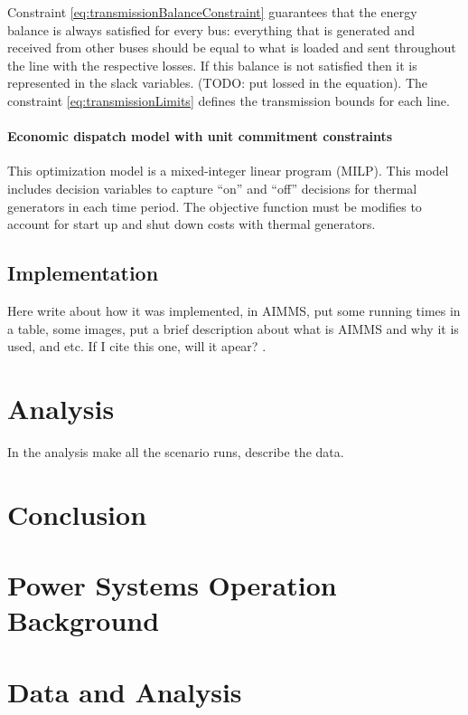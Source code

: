 \documentclass[12pt,LUDisStyle,twosided]{book}
\begin{document}
Constraint \ref{eq:transmissionBalanceConstraint} guarantees that the energy balance is always satisfied for every bus: everything that is generated and received from other buses should be equal to what is loaded and sent throughout the line with the respective losses. If this balance is not satisfied then it is represented in the slack variables. (TODO: put lossed in the equation). The constraint \ref{eq:transmissionLimits} defines the transmission bounds for each line.

\subsubsection{Economic dispatch model with unit commitment constraints}
This optimization model is a mixed-integer linear program (MILP).
This model includes decision variables to capture ``on'' and ``off'' decisions for thermal generators in each time period. 
The objective function must be modifies to account for start up and shut down costs with thermal generators.

\section{Implementation}

Here write about how it was implemented, in AIMMS, put some running times in a table, some images, put a brief description about what is AIMMS and why it is used, and etc. If I cite this one, will it apear? \cite{Refworks:9}.  

\chapter{Analysis}

In the analysis make all the scenario runs, describe the data.

\chapter{Conclusion}

\appendix
\chapter{Power Systems Operation Background}

\chapter{Data and Analysis}


\nocite{*}


\end{document}
